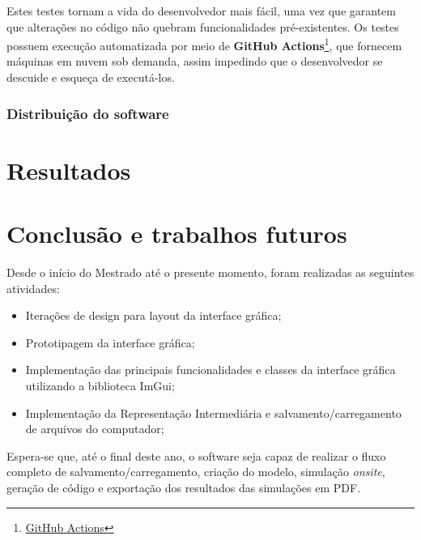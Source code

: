 \documentclass[
	12pt,				%
	openright,			%
	oneside,			%
	a4paper,			%
	main=brazil,
	english,			%
	]{ufsj-abntex2}
\begin{document}
Estes testes tornam a vida do desenvolvedor mais fácil, uma vez que garantem que alterações no código não quebram funcionalidades pré-existentes. Os testes possuem execução automatizada por meio de \textbf{GitHub Actions}\footnote{\href{https://github.com/features/actions}{GitHub Actions}}, que fornecem máquinas em nuvem sob demanda, assim impedindo que o desenvolvedor se descuide e esqueça de executá-los.

\subsection{Distribuição do software}


\chapter{Resultados}
\label{chap:resultados}

\chapter{Conclusão e trabalhos futuros}
\label{chap:conclusao}

Desde o início do Mestrado até o presente momento, foram realizadas as seguintes atividades: 
\begin{itemize}
    \item Iterações de design para layout da interface gráfica;
    \item Prototipagem da interface gráfica;
    \item Implementação das principais funcionalidades e classes da interface gráfica utilizando a biblioteca ImGui;
    \item Implementação da Representação Intermediária e salvamento/carregamento de arquivos do computador;
\end{itemize}

Espera-se que, até o final deste ano, o software seja capaz de realizar o fluxo completo de salvamento/carregamento, criação do modelo, simulação \textit{onsite}, geração de código e exportação dos resultados das simulações em PDF.
\end{document}
